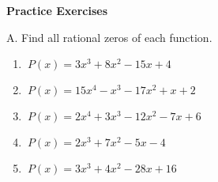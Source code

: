 \textbf{Practice Exercises}

\vspce
A. Find all rational zeros of each function. 


\begin{enumerate}[label = \arabic*. ]

\item \hspce $\ {P(x) = 3x^3+8x^2-15x+4}$
\vspce
\item \hspce $\ {P(x) = 15x^4-x^3-17x^2+x+2}$
\vspce
\item \hspce $\ {P(x) = 2x^4+3x^3-12x^2-7x+6}$
\vspce
\item \hspce $\ {P(x) = 2x^3+7x^2-5x-4}$
\vspce
\item \hspce $\ {P(x) = 3x^3+4x^2-28x+16}$


\end{enumerate}




 



